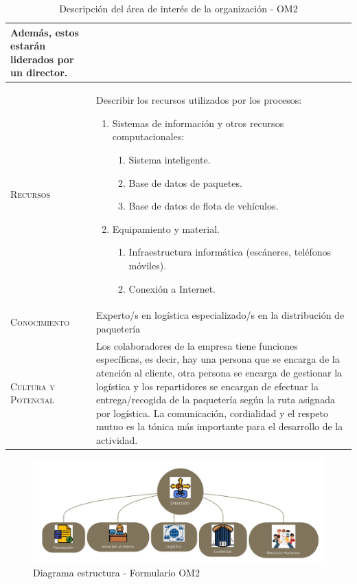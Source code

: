 \begin{table}[H]
\begin{tabularx}{\textwidth}{|l|X|}
    Además, estos estarán liderados por un director. \\ 
    \hline
    \textsc{Recursos} &  Describir los recursos utilizados por los procesos:
    \begin{enumerate}
        \item Sistemas de información y otros recursos computacionales:
        \begin{enumerate}
          \item Sistema inteligente.
          \item Base de datos de paquetes.
          \item Base de datos de flota de vehículos.
        \end{enumerate}
        \item Equipamiento y material.
        \begin{enumerate}
          \item Infraestructura informática (escáneres, teléfonos móviles).
          \item Conexión a Internet.
        \end{enumerate}
    \end{enumerate} \\ 
    \hline
    \textsc{Conocimiento} &  Experto/s en logística especializado/s en la distribución de paquetería \\ 
    \hline
    \textsc{Cultura y Potencial} &  Los colaboradores de la empresa tiene funciones específicas, es decir, hay una persona que se encarga de la atención al cliente, otra persona se encarga de gestionar la logística y los repartidores se encargan de efectuar la entrega/recogida de la paquetería según la ruta asignada por logística. La comunicación, cordialidad y el respeto mutuo es la tónica más importante para el desarrollo de la actividad. \\ 
    \hline
  \end{tabularx}
    \caption{\label{tab:OM2}Descripción del área de interés de la organización - OM2}
\end{table}

\begin{figure}[H]
	\centering
	\includegraphics[scale=0.50]{imaxes/Organigrama.png}
	\caption{\label{fig:diagramaEstructura}Diagrama estructura - Formulario OM2}
\end{figure}

